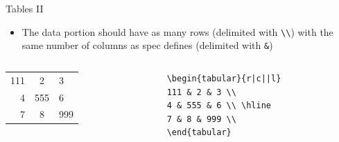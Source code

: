 \documentclass[english]{beamer}
\let\olditem\item
\renewcommand{\item}{\setlength{\itemsep}{\fill}\olditem}
\begin{document}
\begin{frame}[fragile]{Tables II}
    \begin{itemize}        
        \item The data portion should have as many rows (delimited with \verb|\\|) with the same number of columns as spec defines (delimited with \verb|&|)
    \end{itemize}

\begin{columns}
    \begin{column}{0.5\textwidth}
        \begin{tabular}{r|c||l} 
        111 & 2 & 3 \\
        4 & 555 & 6 \\ \hline
        7 & 8 & 999 \\
        \end{tabular}
    \end{column}
    \begin{column}{0.5\textwidth}
        \begin{verbatim}
\begin{tabular}{r|c||l}
111 & 2 & 3 \\
4 & 555 & 6 \\ \hline
7 & 8 & 999 \\
\end{tabular}
        \end{verbatim}
    \end{column}
\end{columns}
\end{frame}
\end{document}
